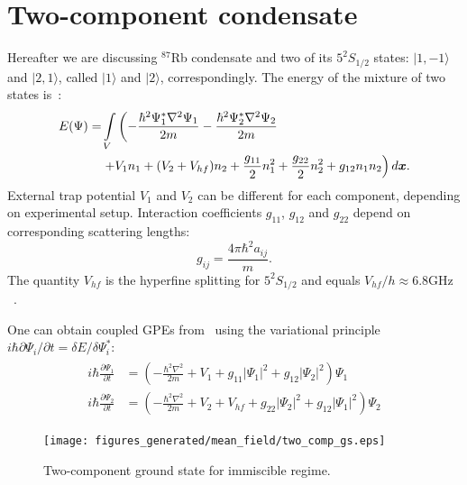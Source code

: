 \section{Two-component condensate}

Hereafter we are discussing $^{87}$Rb condensate and two of its $5^2S_{1/2}$ states: $\vert1,-1\rangle$ and $\vert2,1\rangle$,
called $\vert1\rangle$ and $\vert2\rangle$, correspondingly.
The energy of the mixture of two states is~\cite{Pitaevskii2003}:
\begin{equation}
\label{eqn:mean-field:two-comp-energy}
\begin{split}
	E(\Psi) = & \int\limits_V \left(
		- \frac{\hbar^2 \Psi_1^* \nabla^2 \Psi_1}{2m}
		- \frac{\hbar^2 \Psi_2^* \nabla^2 \Psi_2}{2m}
	\right. \\
	& \left.
		+ V_1 n_1 + ( V_2 + V_{hf} ) n_2
		+ \frac{g_{11}}{2} n_1^2 + \frac{g_{22}}{2} n_2^2 + g_{12} n_1 n_2
	\right) d\boldsymbol{x}.
\end{split}
\end{equation}
External trap potential $V_1$ and $V_2$ can be different for each component, depending on experimental setup.
Interaction coefficients $g_{11}$, $g_{12}$ and $g_{22}$ depend on corresponding scattering lengths:
\[
	g_{ij} = \frac{4 \pi \hbar^2 a_{ij}}{m}.
\]
The quantity $V_{hf}$ is the hyperfine splitting for $5^2S_{1/2}$ and equals $V_{hf} / h \approx 6.8 \textrm{GHz}$~\cite{Steck2009}.

One can obtain coupled GPEs from~ using the variational principle $i \hbar \partial \Psi_i / \partial t = \delta E / \delta \Psi_i^*$:
\begin{align}
\label{eqn:mean-field:two-comp-cgpes}
\begin{split}
	i \hbar \frac{\partial \Psi_1}{\partial t} & = \left(
		-\frac{\hbar^2 \nabla^2}{2 m} + V_1
		+ g_{11} \lvert \Psi_1 \rvert^2 + g_{12} \lvert \Psi_2 \rvert^2
	\right) \Psi_1 \\
	i \hbar \frac{\partial \Psi_2}{\partial t} & = \left(
		-\frac{\hbar^2 \nabla^2}{2 m} + V_2 + V_{hf}
		+ g_{22} \lvert \Psi_2 \rvert^2 + g_{12} \lvert \Psi_1 \rvert^2
	\right) \Psi_2
\end{split}
\end{align}

\begin{figure}
\begin{center}
\texttt{[image: figures\_generated/mean\_field/two\_comp\_gs.eps]}
\caption{Two-component ground state for immiscible regime.}
\label{fig:mean-field:two-comp-gs}
\end{center}
\end{figure}

